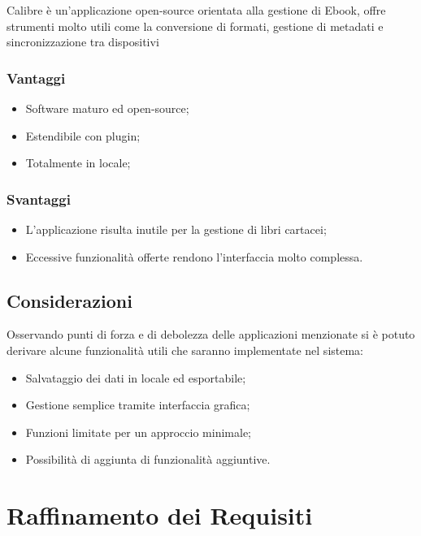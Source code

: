 Calibre è un'applicazione open-source orientata alla gestione di Ebook,
offre strumenti molto utili come la conversione di formati, gestione di
metadati e sincronizzazione tra dispositivi

\subsubsection{Vantaggi}

\begin{itemize}
  \item
    Software maturo ed open-source;
  \item
    Estendibile con plugin;
  \item
    Totalmente in locale;
\end{itemize}

\subsubsection{Svantaggi}

\begin{itemize}
  \item
    L'applicazione risulta inutile per la gestione di libri cartacei;
  \item
    Eccessive funzionalità offerte rendono l'interfaccia molto complessa.
\end{itemize}

\subsection{Considerazioni}

Osservando punti di forza e di debolezza delle applicazioni menzionate
si è potuto derivare alcune funzionalità utili che saranno implementate
nel sistema:

\begin{itemize}
  \item
    Salvataggio dei dati in locale ed esportabile;
  \item
    Gestione semplice tramite interfaccia grafica;
  \item
    Funzioni limitate per un approccio minimale;
  \item
    Possibilità di aggiunta di funzionalità aggiuntive.
\end{itemize}

\newpage
\section{Raffinamento dei Requisiti}
